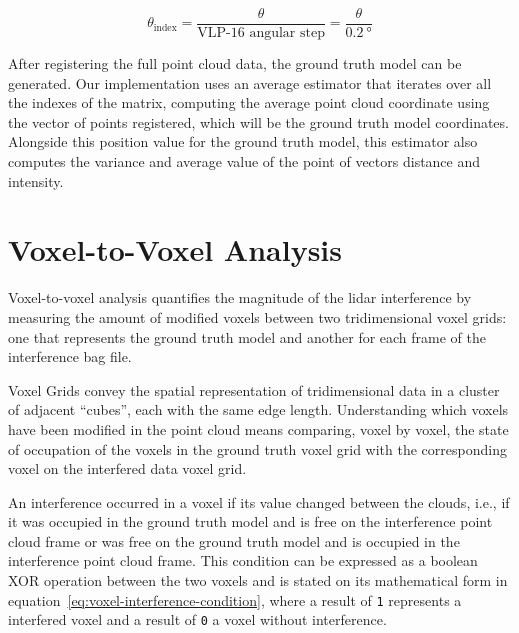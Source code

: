 \begin{equation}
	\label{eq:azimuthal-angle-index}
	\theta_{\text{index}} = \frac{\theta}{\text{VLP-16 angular step}} = \frac{\theta}{\SI{0.2}{\degree}} 
\end{equation}


After registering the full point cloud data, the ground truth model can be generated. Our implementation uses an average estimator that iterates over all the indexes of the matrix, computing the average point cloud coordinate using the vector of points registered, which will be the ground truth model coordinates. Alongside this position value for the ground truth model, this estimator also computes the variance and average value of the point of vectors distance and intensity.





\section{Voxel-to-Voxel Analysis}
\label{sec:lidar-interference:voxel-analysis}
Voxel-to-voxel analysis quantifies the magnitude of the \ac{lidar} interference by measuring the amount of modified voxels between two tridimensional voxel grids: one that represents the ground truth model and another for each frame of the interference bag file.

Voxel Grids convey the spatial representation of tridimensional data in a cluster of adjacent ``cubes'', each with the same edge length. Understanding which voxels have been modified in the point cloud means comparing, voxel by voxel, the state of occupation of the voxels in the ground truth voxel grid with the corresponding voxel on the interfered data voxel grid. 

An interference occurred in a voxel if its value changed between the clouds, i.e., if it was occupied in the ground truth model and is free on the interference point cloud frame or was free on the ground truth model and is occupied in the interference point cloud frame. This condition can be expressed as a boolean XOR operation between the two voxels  and is stated on its mathematical form in equation~\ref{eq:voxel-interference-condition}, where a result of \texttt{1} represents a interfered voxel and a result of \texttt{0} a voxel without interference.

